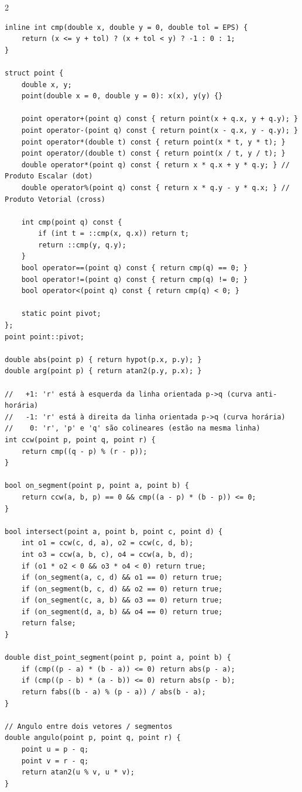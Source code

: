 \documentclass[11pt]{article}
\begin{document}
\begin{multicols}{2}
\begin{lstlisting}
inline int cmp(double x, double y = 0, double tol = EPS) {
    return (x <= y + tol) ? (x + tol < y) ? -1 : 0 : 1;
}

struct point {
    double x, y;
    point(double x = 0, double y = 0): x(x), y(y) {}

    point operator+(point q) const { return point(x + q.x, y + q.y); }
    point operator-(point q) const { return point(x - q.x, y - q.y); }
    point operator*(double t) const { return point(x * t, y * t); }
    point operator/(double t) const { return point(x / t, y / t); }
    double operator*(point q) const { return x * q.x + y * q.y; } // Produto Escalar (dot)
    double operator%(point q) const { return x * q.y - y * q.x; } // Produto Vetorial (cross)

    int cmp(point q) const {
        if (int t = ::cmp(x, q.x)) return t;
        return ::cmp(y, q.y);
    }
    bool operator==(point q) const { return cmp(q) == 0; }
    bool operator!=(point q) const { return cmp(q) != 0; }
    bool operator<(point q) const { return cmp(q) < 0; }

    static point pivot;
};
point point::pivot;

double abs(point p) { return hypot(p.x, p.y); }
double arg(point p) { return atan2(p.y, p.x); }

//   +1: 'r' está à esquerda da linha orientada p->q (curva anti-horária)
//   -1: 'r' está à direita da linha orientada p->q (curva horária)
//    0: 'r', 'p' e 'q' são colineares (estão na mesma linha)
int ccw(point p, point q, point r) {
    return cmp((q - p) % (r - p));
}

bool on_segment(point p, point a, point b) {
    return ccw(a, b, p) == 0 && cmp((a - p) * (b - p)) <= 0;
}

bool intersect(point a, point b, point c, point d) {
    int o1 = ccw(c, d, a), o2 = ccw(c, d, b);
    int o3 = ccw(a, b, c), o4 = ccw(a, b, d);
    if (o1 * o2 < 0 && o3 * o4 < 0) return true;
    if (on_segment(a, c, d) && o1 == 0) return true;
    if (on_segment(b, c, d) && o2 == 0) return true;
    if (on_segment(c, a, b) && o3 == 0) return true;
    if (on_segment(d, a, b) && o4 == 0) return true;
    return false;
}

double dist_point_segment(point p, point a, point b) {
    if (cmp((p - a) * (b - a)) <= 0) return abs(p - a);
    if (cmp((p - b) * (a - b)) <= 0) return abs(p - b);
    return fabs((b - a) % (p - a)) / abs(b - a);
}

// Angulo entre dois vetores / segmentos
double angulo(point p, point q, point r) {
    point u = p - q;
    point v = r - q;
    return atan2(u % v, u * v);
}


\end{lstlisting}
\end{multicols}
\end{document}
